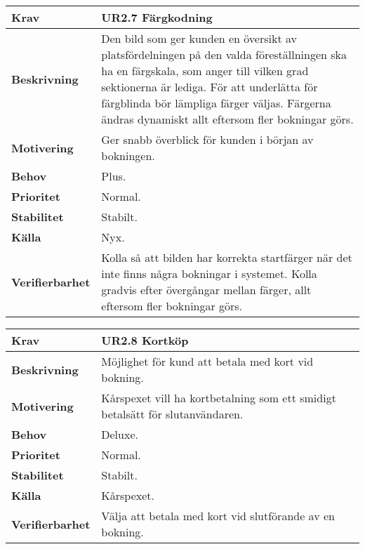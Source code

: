 \documentclass[a4paper, twoside, 11pt, titlepage]{article}
\begin{document}
		\begin{tabular} { p{2.6cm} p{12.5cm} }
			\hline
			\sffamily\textbf{Krav} & \sffamily\textbf{UR2.7 Färgkodning  } \\
			\hline
			\sffamily\textbf{Beskrivning} & Den bild som ger kunden en översikt av platsfördelningen på den valda föreställningen ska ha en färgskala, som anger till vilken grad sektionerna är lediga. För att underlätta för färgblinda bör lämpliga färger väljas. Färgerna ändras dynamiskt allt eftersom fler bokningar görs.  \\
			\hline
			\sffamily\textbf{Motivering} & Ger snabb överblick för kunden i början av bokningen.  \\
			\hline
			\sffamily\textbf{Behov} & Plus.  \\
			\hline
			\sffamily\textbf{Prioritet} & Normal.  \\
			\hline
			\sffamily\textbf{Stabilitet} & Stabilt.  \\
			\hline
			\sffamily\textbf{Källa} & Nyx.  \\
			\hline
			\sffamily\textbf{Verifierbarhet} & Kolla så att bilden har korrekta startfärger när det inte finns några bokningar i systemet. Kolla gradvis efter övergångar mellan färger, allt eftersom fler bokningar görs.  \\
			\hline
		\end{tabular}
		\vspace{6mm}

		\begin{tabular} { p{2.6cm} p{12.5cm} }
			\hline
			\sffamily\textbf{Krav} & \sffamily\textbf{UR2.8 Kortköp  } \\
			\hline
			\sffamily\textbf{Beskrivning} & Möjlighet för kund att betala med kort vid bokning.  \\
			\hline
			\sffamily\textbf{Motivering} & Kårspexet vill ha kortbetalning som ett smidigt betalsätt för slutanvändaren.  \\
			\hline
			\sffamily\textbf{Behov} & Deluxe.  \\
			\hline
			\sffamily\textbf{Prioritet} & Normal.  \\
			\hline
			\sffamily\textbf{Stabilitet} & Stabilt.  \\
			\hline
			\sffamily\textbf{Källa} & Kårspexet.  \\
			\hline
			\sffamily\textbf{Verifierbarhet} & Välja att betala med kort vid slutförande av en bokning.  \\
			\hline
		\end{tabular}
		\vspace{6mm}
\end{document}
